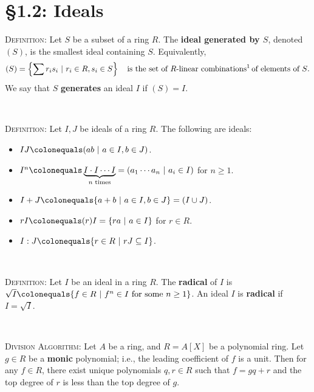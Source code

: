\documentclass[12pt]{amsart}
\newcommand{\showsol}[1]{\def\displaysol{#1}}
\newcommand\ceq{\colonequals}
\begin{document}
\showsol{0}
	
	\thispagestyle{empty}
	
	\section*{\S1.2: Ideals}	

\begin{framed}
\textsc{Definition}: Let $S$ be a subset of a ring $R$. The \textbf{ideal generated by $S$}, denoted $(S)$, is the smallest ideal containing $S$. Equivalently,
\[ ( S )  = \left\{ \sum r_i s_i \ | \ r_i\in R, s_i\in S\right\} \quad \text{is the set of $R$-linear combinations\footnotemark\,of elements of $S$}.\]
We say that $S$ \textbf{generates} an ideal $I$ if $(S)=I$.

\


\textsc{Definition}: Let $I, J$ be ideals of a ring $R$. The following are ideals:
\begin{itemize}
\item $IJ\colonequals ( ab \ | \ a\in I, b\in J)$.
\item $I^n \colonequals \underbrace{I \cdot I\cdots I}_{\text{$n$ times}}= ( a_1 \cdots a_n \ | \ a_i\in I )$ for $n\geq 1$.
\item $I+J \colonequals  \{ a + b \ | \ a\in I, b\in J \} = ( I \cup J)$.
\item $rI \colonequals (r)I = \{ ra \ | \ a\in I\}$ for $r\in R$.
\item $I : J \ceq \{ r\in R \ | \ rJ \subseteq I\}$.
\end{itemize}

\

\textsc{Definition}: Let $I$ be an ideal in a ring $R$. The \textbf{radical} of $I$ is $\sqrt{I} \ceq \{ f\in R \ | \ f^n\in I \ \text{for some} \ n\geq1\}$.
An ideal $I$ is \textbf{radical} if $I=\sqrt{I}$.

\

\textsc{Division Algorithm}: Let $A$ be a ring, and $R=A[X]$ be a polynomial ring. Let $g\in R$ be a \textbf{monic} polynomial; i.e., the leading coefficient of $f$ is a unit. Then for any $f\in R$, there exist unique polynomials $q,r\in R$ such that $f=gq+r$ and the top degree of $r$ is less than the top degree of $g$.
 
 \end{framed}
 
\end{document}
